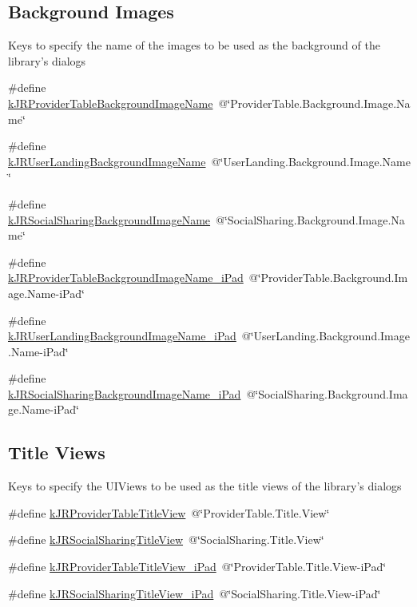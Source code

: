 \subsection*{Background Images}
\label{_amgrp2c0408c2c62eea12966fb29a94739702}
 Keys to specify the name of the images to be used as the background of the library's dialogs \begin{DoxyCompactItemize}
\item 
\#define \hyperlink{group__custom_interface_ga893fb6e20be0c6658e81a6a5d5c121f0}{kJRProviderTableBackgroundImageName}~@\char`\"{}ProviderTable.Background.Image.Name\char`\"{}
\item 
\#define \hyperlink{group__custom_interface_gadda3f945ba5012762eb92764b251b918}{kJRUserLandingBackgroundImageName}~@\char`\"{}UserLanding.Background.Image.Name\char`\"{}
\item 
\#define \hyperlink{group__custom_interface_gad2e00942af19ec9478ba58a491a8b8f2}{kJRSocialSharingBackgroundImageName}~@\char`\"{}SocialSharing.Background.Image.Name\char`\"{}
\item 
\#define \hyperlink{group__custom_interface_ga25b26cff96d8f174f3bdc040031466b7}{kJRProviderTableBackgroundImageName\_\-iPad}~@\char`\"{}ProviderTable.Background.Image.Name-\/iPad\char`\"{}
\item 
\#define \hyperlink{group__custom_interface_ga52b4fb3801cf3fe6e5a294d9a4d1ff0a}{kJRUserLandingBackgroundImageName\_\-iPad}~@\char`\"{}UserLanding.Background.Image.Name-\/iPad\char`\"{}
\item 
\#define \hyperlink{group__custom_interface_ga646cb35f3a7ec2835872ee6df2aceb76}{kJRSocialSharingBackgroundImageName\_\-iPad}~@\char`\"{}SocialSharing.Background.Image.Name-\/iPad\char`\"{}
\end{DoxyCompactItemize}
\subsection*{Title Views}
\label{_amgrp3aa85b42b54fc9202c3d403d77360bef}
 \label{group__custom_interface_titleViews}
\hypertarget{group__custom_interface_titleViews}{}


Keys to specify the UIViews to be used as the title views of the library's dialogs \begin{DoxyCompactItemize}
\item 
\#define \hyperlink{group__custom_interface_ga0bce97edf43c9cdf53cbcd1aa92c4798}{kJRProviderTableTitleView}~@\char`\"{}ProviderTable.Title.View\char`\"{}
\item 
\#define \hyperlink{group__custom_interface_ga524965cf426f0eb9de4bcb804528c7f7}{kJRSocialSharingTitleView}~@\char`\"{}SocialSharing.Title.View\char`\"{}
\item 
\#define \hyperlink{group__custom_interface_ga52c322e9fd2aa78cbd64d050f0fd5e41}{kJRProviderTableTitleView\_\-iPad}~@\char`\"{}ProviderTable.Title.View-\/iPad\char`\"{}
\item 
\#define \hyperlink{group__custom_interface_ga2f88062cdd1fd38ad0e800d382450398}{kJRSocialSharingTitleView\_\-iPad}~@\char`\"{}SocialSharing.Title.View-\/iPad\char`\"{}
\end{DoxyCompactItemize}

